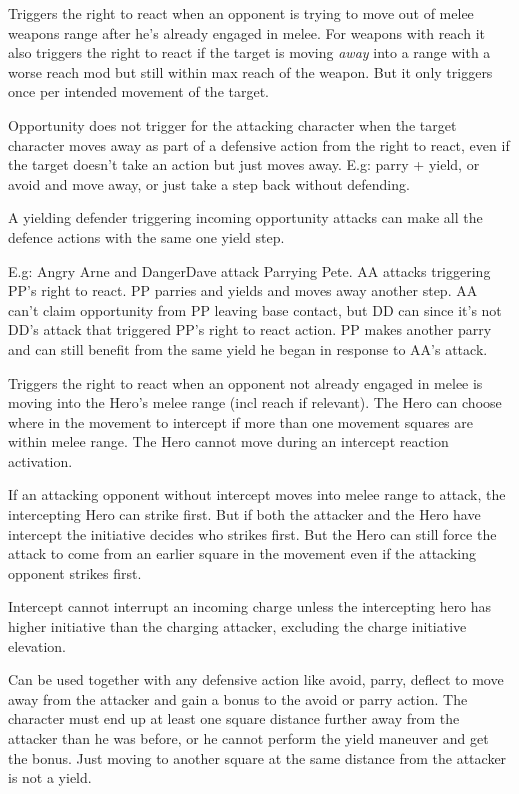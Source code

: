 \openskillslist


Triggers the right to react when an opponent is trying to move out of melee weapons range after he's already engaged in melee. For weapons with reach it also triggers the right to react if the target is moving \emph{away} into a range with a worse reach mod but still within max reach of the weapon. But it only triggers once per intended movement of the target.

Opportunity does not trigger for the attacking character when the target character moves away as part of a defensive action from the right to react, even if the target doesn't take an action but just moves away. E.g: parry + yield, or avoid and move away, or just take a step back without defending.

A yielding defender triggering incoming opportunity attacks can make all the defence actions with the same one yield step.

E.g: Angry Arne and DangerDave attack Parrying Pete. AA attacks triggering PP's right to react. PP parries and yields and moves away another step. AA can't claim opportunity from PP leaving base contact, but DD can since it's not DD's attack that triggered PP's right to react action. PP makes another parry and can still benefit from the same yield he began in response to AA's attack.


Triggers the right to react when an opponent not already engaged in melee is moving into the Hero's melee range (incl reach if relevant). The Hero can choose where in the movement to intercept if more than one movement squares are within melee range. The Hero cannot move during an intercept reaction activation.

If an attacking opponent without intercept moves into melee range to attack, the intercepting Hero can strike first. But if both the attacker and the Hero have intercept the initiative decides who strikes first. But the Hero can still force the attack to come from an earlier square in the movement even if the attacking opponent strikes first.

Intercept cannot interrupt an incoming charge unless the intercepting hero has higher initiative than the charging attacker, excluding the charge initiative elevation.


Can be used together with any defensive action like avoid, parry, deflect to move away from the attacker and gain a bonus to the avoid or parry action. The character must end up at least one square distance further away from the attacker than he was before, or he cannot perform the yield maneuver and get the bonus. Just moving to another square at the same distance from the attacker is not a yield.

